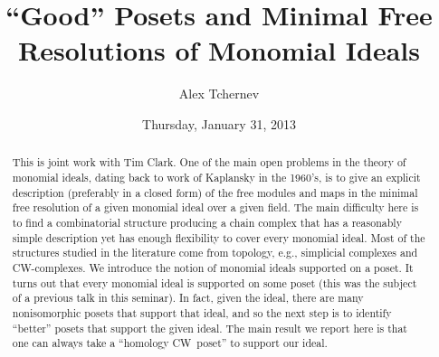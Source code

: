 \documentclass{UAmathtalk}
\author{Alex Tchernev}
\title{``Good'' Posets and Minimal Free Resolutions of Monomial Ideals}
\date{Thursday, January 31, 2013}
\begin{document}
\maketitle

\begin{abstract}
This is joint work with Tim Clark. One of the main open problems in the theory of monomial ideals, dating back to work of Kaplansky in the 1960's, is to give an explicit description (preferably in a closed form) of the free modules and maps in the minimal free resolution of a given monomial ideal over a given field. The main difficulty here is to find a combinatorial structure producing a chain complex that has a reasonably simple description yet has enough flexibility to cover every monomial ideal.  Most of the structures studied in the literature come from topology, e.g., simplicial complexes and CW-complexes. We introduce the notion of monomial ideals supported on a poset.  It turns out that every monomial ideal is supported on some poset (this was the subject of a previous talk in this seminar).  In fact, given the ideal, there are many nonisomorphic posets that support that ideal, and so the next step is to identify ``better'' posets that support the given ideal. The main result we report here is that one can always take a ``homology CW~poset'' to support our ideal.
\end{abstract}
\end{document}
